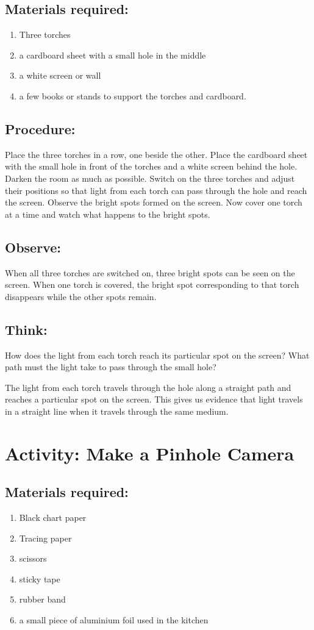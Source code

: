 \documentclass{xtufte-handout}
\begin{document}
\subsection{Materials required:}
\begin{enumerate}
\item Three torches
\item a cardboard sheet with a small hole in the middle
\item a white screen or wall
\item a few books or stands to support the torches and cardboard.
\end{enumerate}
\subsection{Procedure:} Place the three torches in a row, one beside the other. Place the cardboard sheet with the small hole in front of the torches and a white screen behind the hole. Darken the room as much as possible. Switch on the three torches and adjust their positions so that light from each torch can pass through the hole and reach the screen. Observe the bright spots formed on the screen. Now cover one torch at a time and watch what happens to the bright spots.
\subsection{Observe:} When all three torches are switched on, three bright spots can be seen on the screen. When one torch is covered, the bright spot corresponding to that torch disappears while the other spots remain.
\subsection{Think:} How does the light from each torch reach its particular spot on the screen? What path must the light take to pass through the small hole?

The light from each torch travels through the hole along a straight path and reaches a particular spot on the screen. This gives us evidence that light travels in a straight line when it travels through the same medium.

\section{Activity: Make a Pinhole Camera}
\subsection{Materials required:}
\begin{enumerate} 
  \item Black chart paper 
  \item Tracing paper 
  \item scissors
  \item sticky tape
  \item rubber band
  \item a small piece of aluminium foil used in the kitchen
\end{enumerate}
\end{document}
